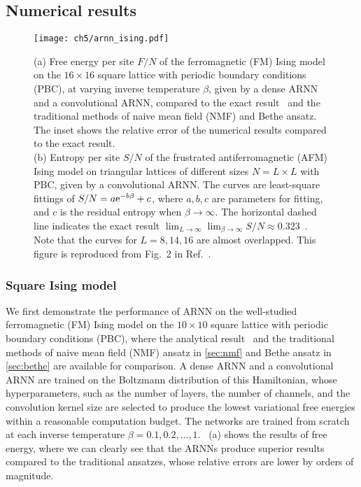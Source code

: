 \subsection{Numerical results}

\begin{figure}[htb]
\centering
\texttt{[image: ch5/arnn\_ising.pdf]}
\caption[ARNN results of Ising model on square and triangular lattices]{
(a) Free energy per site $F / N$ of the ferromagnetic (FM) Ising model on the $16 \times 16$ square lattice with periodic boundary conditions (PBC), at varying inverse temperature $\beta$, given by a dense ARNN and a convolutional ARNN, compared to the exact result~\cite{onsager1944crystal} and the traditional methods of naive mean field (NMF) and Bethe ansatz.
The inset shows the relative error of the numerical results compared to the exact result. \\
(b) Entropy per site $S / N$ of the frustrated antiferromagnetic (AFM) Ising model on triangular lattices of different sizes $N = L \times L$ with PBC, given by a convolutional ARNN.
The curves are least-square fittings of $S / N = a \mathrm{e}^{-b \beta} + c$, where $a, b, c$ are parameters for fitting, and $c$ is the residual  entropy when $\beta \to \infty$.
The horizontal dashed line indicates the exact result $\lim_{L \to \infty} \lim_{\beta \to \infty} S / N \approx 0.323$~\cite{wannier1950antiferromagnetism, wannier1973antiferromagnetism}.
Note that the curves for $L = 8, 14, 16$ are almost overlapped.
This figure is reproduced from Fig.~2 in Ref.~\cite{wu2019solving}.
}
\label{fig:arnn-ising}
\end{figure}

\subsubsection{Square Ising model}

We first demonstrate the performance of ARNN on the well-studied ferromagnetic (FM) Ising model on the $10 \times 10$ square lattice with periodic boundary conditions (PBC), where the analytical result~\cite{onsager1944crystal} and the traditional methods of naive mean field (NMF) ansatz in \cref{sec:nmf} and Bethe ansatz in \cref{sec:bethe} are available for comparison. A dense ARNN and a convolutional ARNN are trained on the Boltzmann distribution of this Hamiltonian, whose hyperparameters, such as the number of layers, the number of channels, and the convolution kernel size are selected to produce the lowest variational free energies within a reasonable computation budget. The networks are trained from scratch at each inverse temperature $\beta = 0.1, 0.2, \ldots, 1$. ~(a) shows the results of free energy, where we can clearly see that the ARNNs produce superior results compared to the traditional ansatzes, whose relative errors are lower by orders of magnitude.

